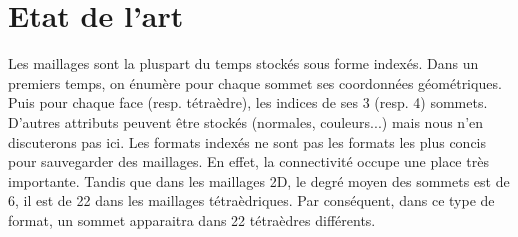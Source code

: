 \documentclass[a4paper,11pt,openany]{article}
\begin{document}
\section{Etat de l'art}
\noindent
Les maillages sont la pluspart du temps stockés sous forme indexés. Dans un premiers temps, on énumère pour chaque sommet ses coordonnées géométriques. Puis pour chaque face (resp. tétraèdre), les indices de ses 3 (resp. 4) sommets. D'autres attributs peuvent être stockés (normales, couleurs...) mais nous n'en discuterons pas ici. Les formats indexés ne sont pas les formats les plus concis pour sauvegarder des maillages. En effet, la connectivité occupe une place très importante. Tandis que dans les maillages 2D, le degré moyen des sommets est de 6, il est de 22 dans les maillages tétraèdriques. Par conséquent, dans ce type de format, un sommet apparaitra dans 22 tétraèdres différents.\\
\end{document}
